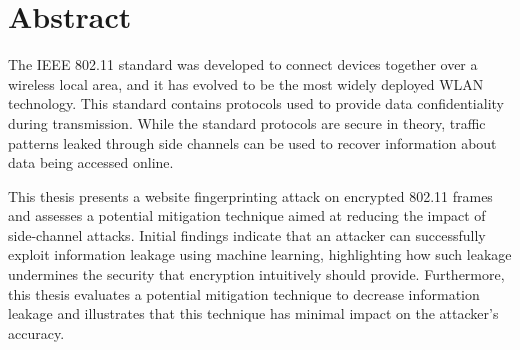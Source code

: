 \par\break\null%
\vsize%
{\centering\section*{Abstract}}

The IEEE 802.11 standard was developed to connect devices together over a wireless local area, and it has evolved to be the most widely deployed WLAN technology. This standard contains protocols used to provide data confidentiality during transmission. While the standard protocols are secure in theory, traffic patterns leaked through side channels can be used to recover information about data being accessed online. 

This thesis presents a website fingerprinting attack on encrypted 802.11 frames and assesses a potential mitigation technique aimed at reducing the impact of side-channel attacks. Initial findings indicate that an attacker can successfully exploit information leakage using machine learning, highlighting how such leakage undermines the security that encryption intuitively should provide. Furthermore, this thesis evaluates a potential mitigation technique to decrease information leakage and illustrates that this technique has minimal impact on the attacker's accuracy.

\vfill\break%
